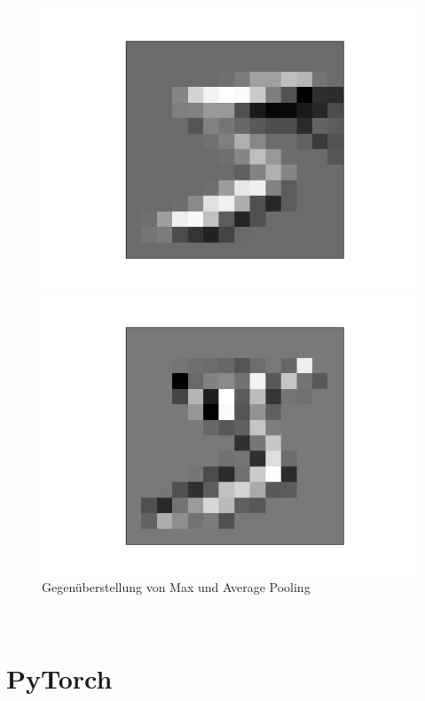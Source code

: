 \documentclass{article}
\begin{document}
\begin{figure}[h]
\begin{minipage}{0.2\linewidth}
	\includegraphics[width=\linewidth]{../graphics/mnist_5/conv_pool/lower_horiz_avgpooled.png}
\end{minipage}
\hfill
\begin{minipage}{0.2\linewidth}
	\centering
	\includegraphics[width=\linewidth]{../graphics/mnist_5/conv_pool/right_vert_avgpooled.png}
\end{minipage}
\caption{Gegenüberstellung von Max und Average Pooling}
\label{Pooling_Mnist}
\end{figure}
\\
\section{PyTorch}
\end{document}
